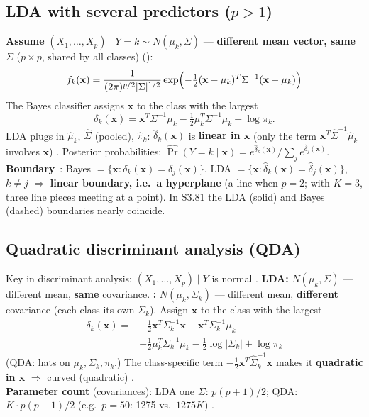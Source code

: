 \subsection{LDA with several predictors ($p>1$)}

\begin{keybox}[LDA, p > 1]
\textbf{Assume} $(X_1,\dots,X_p)\mid Y=k\sim N(\mu_k,\Sigma)$ --- \textbf{different mean vector, same
} $\Sigma$ ($p\times p$, shared by all classes) 
():
\[ f_k(\mathbf x)=\frac{1}{(2\pi)^{p/2}|\Sigma|^{1/2}}
\exp\Bigl(-\tfrac12(\mathbf x-\mu_k)^T\Sigma^{-1}(\mathbf x-\mu_k)\Bigr) \]
The Bayes classifier assigns $\mathbf x$ to the class with the largest
\[ \delta_k(\mathbf x)=\mathbf x^T\Sigma^{-1}\mu_k-\tfrac12\mu_k^T\Sigma^{-1}\mu_k+\log\pi_k . \]
LDA plugs in $\hat\mu_k$, $\hat\Sigma$ (pooled), $\hat\pi_k$: $\hat\delta_k(\mathbf x)$ is \textbf{linear in $\mathbf x$}
(only the term $\mathbf x^T\hat\Sigma^{-1}\hat\mu_k$ involves $\mathbf x$) .
Posterior probabilities: $\widehat{\Pr}(Y=k\mid\mathbf x)=e^{\hat\delta_k(\mathbf x)}\big/\sum_j e^{\hat\delta_j(\mathbf x)}$.\\
\textbf{Boundary} \,: Bayes $=\{\mathbf x:\delta_k(\mathbf x)=\delta_j(\mathbf x)\}$, LDA
$=\{\mathbf x:\hat\delta_k(\mathbf x)=\hat\delta_j(\mathbf x)\}$, $k\neq j$ $\Rightarrow$ \textbf{linear
boundary, i.e.\ a hyperplane} (a line when $p=2$; with $K=3$, three line pieces meeting at a point). In S3.81 the
LDA (solid) and Bayes (dashed) boundaries nearly coincide.
\end{keybox}

\subsection{Quadratic discriminant analysis (QDA)}

\begin{keybox}[QDA]
Key in discriminant analysis: $(X_1,\dots,X_p)\mid Y$ is normal .
\textbf{LDA:} $N(\mu_k,\Sigma)$ --- different mean, \textbf{same} covariance.
\textbf{:} $N(\mu_k,\Sigma_k)$ --- different mean, \textbf{different} covariance (each class its own $\Sigma_k$).
Assign $\mathbf x$ to the class with the largest 
\begin{align*}
\delta_k(\mathbf x)=&-\tfrac12\mathbf x^T\Sigma_k^{-1}\mathbf x+\mathbf x^T\Sigma_k^{-1}\mu_k\\
&-\tfrac12\mu_k^T\Sigma_k^{-1}\mu_k-\tfrac12\log|\Sigma_k|+\log\pi_k
\end{align*}
(QDA: hats on $\mu_k,\Sigma_k,\pi_k$.) The class-specific term $-\tfrac12\mathbf x^T\hat\Sigma_k^{-1}\mathbf x$ makes it \textbf{quadratic in $\mathbf x$} $\Rightarrow$ curved (quadratic)
.\\
\textbf{Parameter count} (covariances): LDA one $\Sigma$: $p(p+1)/2$; QDA: $K\cdot p(p+1)/2$
(e.g.\ $p=50$: 1275 vs.\ $1275K$) .
\end{keybox}

